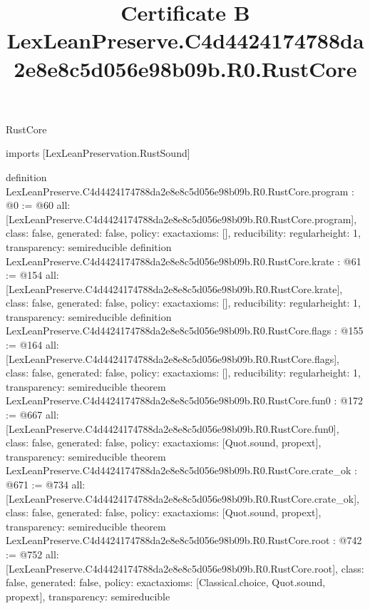 \begin{lexlean}{RustCore}
\title{Certificate B LexLeanPreserve.C4d4424174788da2e8e8c5d056e98b09b.R0.RustCore}
\begin{coremodule}
imports [LexLeanPreservation.RustSound]

definition LexLeanPreserve.C4d4424174788da2e8e8c5d056e98b09b.R0.RustCore.program : @0 := @60 {
  all: [LexLeanPreserve.C4d4424174788da2e8e8c5d056e98b09b.R0.RustCore.program],
  class: false,
  generated: false,
  policy: exact{axioms: []},
  reducibility: regular{height: 1},
  transparency: semireducible
}
definition LexLeanPreserve.C4d4424174788da2e8e8c5d056e98b09b.R0.RustCore.krate : @61 := @154 {
  all: [LexLeanPreserve.C4d4424174788da2e8e8c5d056e98b09b.R0.RustCore.krate],
  class: false,
  generated: false,
  policy: exact{axioms: []},
  reducibility: regular{height: 1},
  transparency: semireducible
}
definition LexLeanPreserve.C4d4424174788da2e8e8c5d056e98b09b.R0.RustCore.flags : @155 := @164 {
  all: [LexLeanPreserve.C4d4424174788da2e8e8c5d056e98b09b.R0.RustCore.flags],
  class: false,
  generated: false,
  policy: exact{axioms: []},
  reducibility: regular{height: 1},
  transparency: semireducible
}
theorem LexLeanPreserve.C4d4424174788da2e8e8c5d056e98b09b.R0.RustCore.fun0 : @172 := @667 {
  all: [LexLeanPreserve.C4d4424174788da2e8e8c5d056e98b09b.R0.RustCore.fun0],
  class: false,
  generated: false,
  policy: exact{axioms: [Quot.sound, propext]},
  transparency: semireducible
}
theorem LexLeanPreserve.C4d4424174788da2e8e8c5d056e98b09b.R0.RustCore.crate_ok : @671 := @734 {
  all: [LexLeanPreserve.C4d4424174788da2e8e8c5d056e98b09b.R0.RustCore.crate_ok],
  class: false,
  generated: false,
  policy: exact{axioms: [Quot.sound, propext]},
  transparency: semireducible
}
theorem LexLeanPreserve.C4d4424174788da2e8e8c5d056e98b09b.R0.RustCore.root : @742 := @752 {
  all: [LexLeanPreserve.C4d4424174788da2e8e8c5d056e98b09b.R0.RustCore.root],
  class: false,
  generated: false,
  policy: exact{axioms: [Classical.choice, Quot.sound, propext]},
  transparency: semireducible
}


\end{coremodule}
\end{lexlean}
